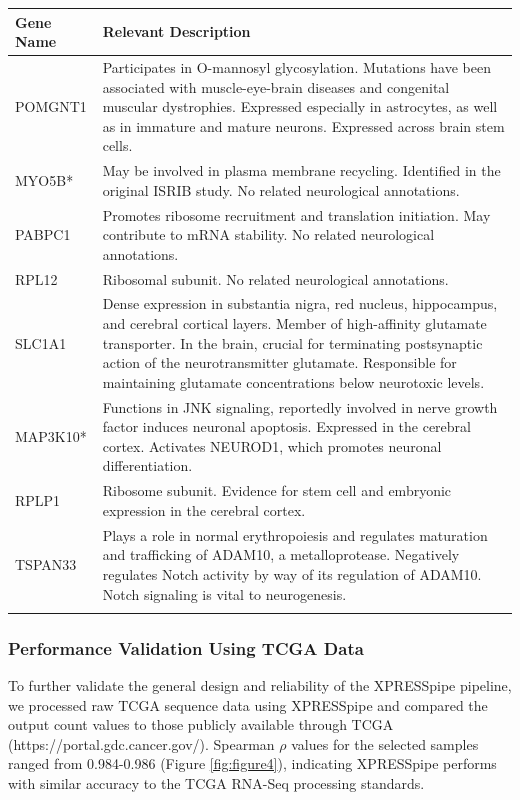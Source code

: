 \documentclass[10pt, oneside]{article}
\begin{document}
\begin{table}[!]
    \centering
{}
\begin{tabular}{p{2.5cm}p{15.5cm}}
 \textbf{Gene Name} & \textbf{Relevant Description} \\
 \hline
 POMGNT1 & Participates in O-mannosyl glycosylation. Mutations have been associated with muscle-eye-brain diseases and congenital muscular dystrophies. Expressed especially in astrocytes, as well as in immature and mature neurons. Expressed across brain stem cells. \\
 \hline
 MYO5B* & May be involved in plasma membrane recycling. Identified in the original ISRIB study. No related neurological annotations. \\
 \hline
 PABPC1 & Promotes ribosome recruitment and translation initiation. May contribute to mRNA stability. No related neurological annotations. \\
 \hline
 RPL12 & Ribosomal subunit. No related neurological annotations. \\
 \hline
 SLC1A1 & Dense expression in substantia nigra, red nucleus, hippocampus, and cerebral cortical layers. Member of high-affinity glutamate transporter. In the brain, crucial for terminating postsynaptic action of the neurotransmitter glutamate. Responsible for maintaining glutamate concentrations below neurotoxic levels. \\
 \hline
 MAP3K10* & Functions in JNK signaling, reportedly involved in nerve growth factor induces neuronal apoptosis. Expressed in the cerebral cortex. Activates NEUROD1, which promotes neuronal differentiation. \\
 \hline
 RPLP1 & Ribosome subunit. Evidence for stem cell and embryonic expression in the cerebral cortex. \\
 \hline
 TSPAN33 & Plays a role in normal erythropoiesis and regulates maturation and trafficking of ADAM10, a metalloprotease. Negatively regulates Notch activity by way of its regulation of ADAM10. Notch signaling is vital to neurogenesis. \\
 \label{tab:targets}
\end{tabular}
\end{table}


\subsubsection{Performance Validation Using TCGA Data}
To further validate the general design and reliability of the XPRESSpipe pipeline, we processed raw TCGA sequence data using XPRESSpipe and compared the output count values to those publicly available through TCGA (https://portal.gdc.cancer.gov/). Spearman $\rho$ values for the selected samples ranged from 0.984-0.986 (Figure \ref{fig:figure4}), indicating XPRESSpipe performs with similar accuracy to the TCGA RNA-Seq processing standards. \par
\end{document}
